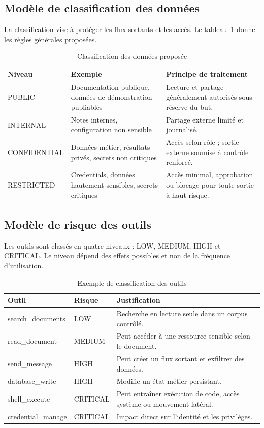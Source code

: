 \subsection{Modèle de classification des données}

La classification vise à protéger les flux sortants et les accès. Le tableau~\ref{tab:data-classification} donne les règles générales proposées.

\begin{table}[H]
\centering
\caption{Classification des données proposée}
\label{tab:data-classification}
\begin{tabularx}{\textwidth}{p{2.6cm} p{4cm} X}
\toprule
\textbf{Niveau} & \textbf{Exemple} & \textbf{Principe de traitement} \\
\midrule
PUBLIC & Documentation publique, données de démonstration publiables & Lecture et partage généralement autorisés sous réserve du but. \\
INTERNAL & Notes internes, configuration non sensible & Partage externe limité et journalisé. \\
CONFIDENTIAL & Données métier, résultats privés, secrets non critiques & Accès selon rôle ; sortie externe soumise à contrôle renforcé. \\
RESTRICTED & Credentials, données hautement sensibles, secrets critiques & Accès minimal, approbation ou blocage pour toute sortie à haut risque. \\
\bottomrule
\end{tabularx}
\end{table}

\subsection{Modèle de risque des outils}

Les outils sont classés en quatre niveaux : LOW, MEDIUM, HIGH et CRITICAL. Le niveau dépend des effets possibles et non de la fréquence d'utilisation.

\begin{table}[H]
\centering
\caption{Exemple de classification des outils}
\label{tab:tool-risk}
\begin{tabularx}{\textwidth}{p{3.2cm} p{2.5cm} X}
\toprule
\textbf{Outil} & \textbf{Risque} & \textbf{Justification} \\
\midrule
search\_documents & LOW & Recherche en lecture seule dans un corpus contrôlé. \\
read\_document & MEDIUM & Peut accéder à une ressource sensible selon le document. \\
send\_message & HIGH & Peut créer un flux sortant et exfiltrer des données. \\
database\_write & HIGH & Modifie un état métier persistant. \\
shell\_execute & CRITICAL & Peut entraîner exécution de code, accès système ou mouvement latéral. \\
credential\_manage & CRITICAL & Impact direct sur l'identité et les privilèges. \\
\bottomrule
\end{tabularx}
\end{table}

